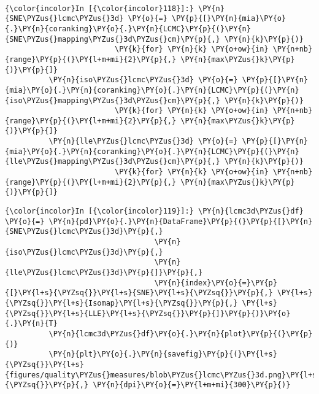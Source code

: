     \begin{center}
    \end{center}
    { \hspace*{\fill} \\}

    \begin{Verbatim}[commandchars=\\\{\}]
{\color{incolor}In [{\color{incolor}118}]:} \PY{n}{SNE\PYZus{}lcmc\PYZus{}3d} \PY{o}{=} \PY{p}{[}\PY{n}{mia}\PY{o}{.}\PY{n}{coranking}\PY{o}{.}\PY{n}{LCMC}\PY{p}{(}\PY{n}{SNE\PYZus{}mapping\PYZus{}3d\PYZus{}cm}\PY{p}{,} \PY{n}{k}\PY{p}{)}
                         \PY{k}{for} \PY{n}{k} \PY{o+ow}{in} \PY{n+nb}{range}\PY{p}{(}\PY{l+m+mi}{2}\PY{p}{,} \PY{n}{max\PYZus{}k}\PY{p}{)}\PY{p}{]}
          \PY{n}{iso\PYZus{}lcmc\PYZus{}3d} \PY{o}{=} \PY{p}{[}\PY{n}{mia}\PY{o}{.}\PY{n}{coranking}\PY{o}{.}\PY{n}{LCMC}\PY{p}{(}\PY{n}{iso\PYZus{}mapping\PYZus{}3d\PYZus{}cm}\PY{p}{,} \PY{n}{k}\PY{p}{)}
                         \PY{k}{for} \PY{n}{k} \PY{o+ow}{in} \PY{n+nb}{range}\PY{p}{(}\PY{l+m+mi}{2}\PY{p}{,} \PY{n}{max\PYZus{}k}\PY{p}{)}\PY{p}{]}
          \PY{n}{lle\PYZus{}lcmc\PYZus{}3d} \PY{o}{=} \PY{p}{[}\PY{n}{mia}\PY{o}{.}\PY{n}{coranking}\PY{o}{.}\PY{n}{LCMC}\PY{p}{(}\PY{n}{lle\PYZus{}mapping\PYZus{}3d\PYZus{}cm}\PY{p}{,} \PY{n}{k}\PY{p}{)}
                         \PY{k}{for} \PY{n}{k} \PY{o+ow}{in} \PY{n+nb}{range}\PY{p}{(}\PY{l+m+mi}{2}\PY{p}{,} \PY{n}{max\PYZus{}k}\PY{p}{)}\PY{p}{]}
\end{Verbatim}

    \begin{Verbatim}[commandchars=\\\{\}]
{\color{incolor}In [{\color{incolor}119}]:} \PY{n}{lcmc3d\PYZus{}df} \PY{o}{=} \PY{n}{pd}\PY{o}{.}\PY{n}{DataFrame}\PY{p}{(}\PY{p}{[}\PY{n}{SNE\PYZus{}lcmc\PYZus{}3d}\PY{p}{,}
                                  \PY{n}{iso\PYZus{}lcmc\PYZus{}3d}\PY{p}{,}
                                  \PY{n}{lle\PYZus{}lcmc\PYZus{}3d}\PY{p}{]}\PY{p}{,}
                                  \PY{n}{index}\PY{o}{=}\PY{p}{[}\PY{l+s}{\PYZsq{}}\PY{l+s}{SNE}\PY{l+s}{\PYZsq{}}\PY{p}{,} \PY{l+s}{\PYZsq{}}\PY{l+s}{Isomap}\PY{l+s}{\PYZsq{}}\PY{p}{,} \PY{l+s}{\PYZsq{}}\PY{l+s}{LLE}\PY{l+s}{\PYZsq{}}\PY{p}{]}\PY{p}{)}\PY{o}{.}\PY{n}{T}
          \PY{n}{lcmc3d\PYZus{}df}\PY{o}{.}\PY{n}{plot}\PY{p}{(}\PY{p}{)}
          \PY{n}{plt}\PY{o}{.}\PY{n}{savefig}\PY{p}{(}\PY{l+s}{\PYZsq{}}\PY{l+s}{figures/quality\PYZus{}measures/blob\PYZus{}lcmc\PYZus{}3d.png}\PY{l+s}{\PYZsq{}}\PY{p}{,} \PY{n}{dpi}\PY{o}{=}\PY{l+m+mi}{300}\PY{p}{)}
\end{Verbatim}

